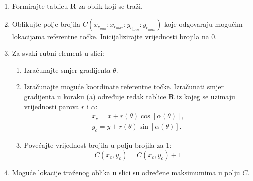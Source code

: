 \documentclass[11pt,english]{article}
\begin{document}
\begin{enumerate}
  \item Formirajte tablicu $\mathbf R$ za oblik koji se traži.
  \item Oblikujte polje brojila $C(x_{c_{min}}:x_{c_{max}}:y_{c_{min}}:y_{c_{max}})$ koje odgovaraju mogućim lokacijama referentne točke. Inicijalizirajte vrijednosti brojila na 0.
  \item Za svaki rubni element u slici:
  \begin{enumerate}
    \item Izračunajte smjer gradijenta $\theta$.
    \item Izračunajte moguće koordinate referentne točke. Izračunati smjer gradijenta u koraku (a) određuje redak tablice $\mathbf R$ iz kojeg se uzimaju vrijednosti parova $r$ i $\alpha$:
    \begin{align*}
      x_c = x+r(\theta)\cos[\alpha(\theta)],\\
      y_c = y+r(\theta)\sin[\alpha(\theta)].
    \end{align*}
    \item Povećajte vrijednost brojila u polju brojila za 1:
    $$C(x_c,y_c) = C(x_c,y_c)+1$$
  \end{enumerate}
  \item Moguće lokacije traženog oblika u slici su određene maksimumima u polju $C$.
\end{enumerate}
\end{document}
